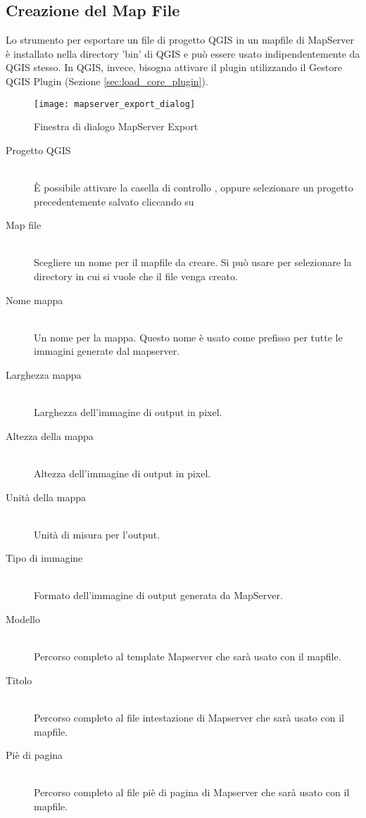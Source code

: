 \subsection{Creazione del Map File}

Lo strumento  per esportare un file di progetto QGIS in un mapfile di MapServer 
è installato nella directory 'bin' di QGIS e può essere usato indipendentemente da QGIS stesso. 
In QGIS, invece, bisogna attivare il plugin utilizzando il Gestore QGIS Plugin 
(Sezione \ref{sec:load_core_plugin}).

\begin{figure}[ht]
\centering
  \texttt{[image: mapserver\_export\_dialog]}
  \caption{Finestra di dialogo MapServer Export \nixcaption}
  \label{fig:mapserver_export_dialog}
\end{figure}

\begin{description}
\item [Progetto QGIS] \mbox{}\\
È possibile attivare la casella di controllo , oppure selezionare un 
progetto precedentemente salvato cliccando su 
\item [Map file] \mbox{}\\
Scegliere un nome per il mapfile da creare. Si può usare  per selezionare 
la directory in cui si vuole che il file venga creato. 
\item [Nome mappa] \mbox{}\\
	Un nome per la mappa. Questo nome è usato come prefisso per tutte le immagini generate dal mapserver.
\item [Larghezza mappa] \mbox{}\\
Larghezza dell'immagine di output in pixel.
\item [Altezza della mappa] \mbox{}\\
Altezza dell'immagine di output in pixel.
\item [Unità della mappa] \mbox{}\\
Unità di misura per l'output.
\item [Tipo di immagine] \mbox{}\\
Formato dell'immagine di output generata da MapServer.
\item [Modello] \mbox{}\\
Percorso completo al template Mapserver che sarà usato con il mapfile.
\item [Titolo] \mbox{}\\
Percorso completo al file intestazione di Mapserver che sarà usato con il mapfile.
\item [Piè di pagina] \mbox{}\\
Percorso completo al file piè di pagina di Mapserver che sarà usato con il mapfile.
\end{description}

